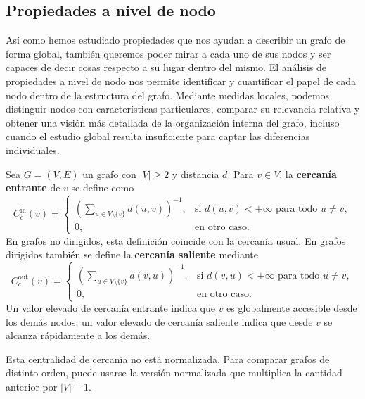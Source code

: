         \subsection{Propiedades a nivel de nodo}

            Así como hemos estudiado propiedades que nos ayudan a describir un grafo de forma global, también queremos poder mirar a cada uno de sus nodos y ser capaces de decir cosas respecto a su lugar dentro del mismo. El análisis de propiedades a nivel de nodo nos permite identificar y cuantificar el papel de cada nodo dentro de la estructura del grafo. Mediante medidas locales, podemos distinguir nodos con características particulares, comparar su relevancia relativa y obtener una visión más detallada de la organización interna del grafo, incluso cuando el estudio global resulta insuficiente para captar las diferencias individuales.

            \begin{definicion}
                Sea $G=(V,E)$ un grafo con $|V|\ge 2$ y distancia $d$. Para $v\in V$, la \textbf{cercanía entrante} de $v$ se define como
                \[
                C_c^{\mathrm{in}}(v)=
                \begin{cases}
                \left(\sum_{u\in V\setminus\{v\}} d(u,v)\right)^{-1},
                & \text{si } d(u,v)<+\infty \text{ para todo }u\neq v,\\
                0,
                & \text{en otro caso.}
                \end{cases}
                \]
                En grafos no dirigidos, esta definición coincide con la cercanía usual. En grafos dirigidos también se define la \textbf{cercanía saliente} mediante
                \[
                C_c^{\mathrm{out}}(v)=
                \begin{cases}
                \left(\sum_{u\in V\setminus\{v\}} d(v,u)\right)^{-1},
                & \text{si } d(v,u)<+\infty \text{ para todo }u\neq v,\\
                0,
                & \text{en otro caso.}
                \end{cases}
                \]
                Un valor elevado de cercanía entrante indica que $v$ es globalmente accesible desde los demás nodos; un valor elevado de cercanía saliente indica que desde $v$ se alcanza rápidamente a los demás.
            \end{definicion}

            \begin{observacion}
                Esta centralidad de cercanía no está normalizada. Para comparar grafos de distinto orden, puede usarse la versión normalizada que multiplica la cantidad anterior por $|V|-1$.
            \end{observacion}

